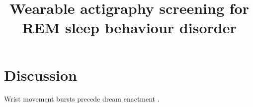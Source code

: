 \documentclass{article}
\title{Wearable actigraphy screening for REM sleep behaviour disorder}
\begin{document}
\maketitle
\section{Discussion}
Wrist movement bursts precede dream enactment \cite{garcia2022}.
\end{document}
